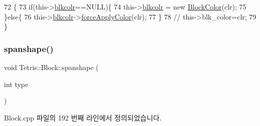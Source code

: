 \begin{DoxyCode}
72                                                 \{
73                 \textcolor{keywordflow}{if}(this->\hyperlink{class_tetris_1_1_block_ab7cfb062eb49e791c94bac4a2e7a7ca9}{blkcolr}==NULL)\{
74                     this->\hyperlink{class_tetris_1_1_block_ab7cfb062eb49e791c94bac4a2e7a7ca9}{blkcolr} = \textcolor{keyword}{new} \hyperlink{class_tetris_1_1_block_sub_modules_1_1_block_color}{BlockColor}(clr);
75                 \}\textcolor{keywordflow}{else}\{
76                     this->\hyperlink{class_tetris_1_1_block_ab7cfb062eb49e791c94bac4a2e7a7ca9}{blkcolr}->\hyperlink{class_tetris_1_1_block_sub_modules_1_1_block_color_a260b5dd85cdf3145be7564dc2c0ee53d}{forceApplyColor}(clr);
77                 \}
78                \textcolor{comment}{// this->blk\_color=clr;}
79             \}
\end{DoxyCode}
\mbox{\label{class_tetris_1_1_block_ad683f161157c16b80d5df8929bca468c}} 
\subsubsection{\texorpdfstring{spanshape()}{spanshape()}\hspace{0.1cm}{\footnotesize\ttfamily [1/2]}}
{\footnotesize\ttfamily void Tetris\+::\+Block\+::spanshape (\begin{DoxyParamCaption}\item[{int}]{type }\end{DoxyParamCaption})\hspace{0.3cm}{\ttfamily [private]}}



Block.\+cpp 파일의 192 번째 라인에서 정의되었습니다.


